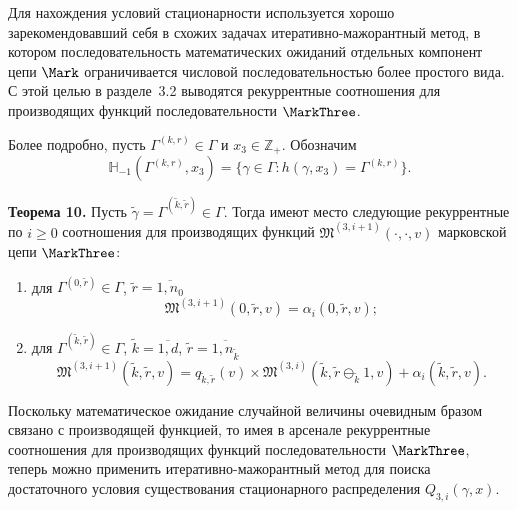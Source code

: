 Для нахождения условий стационарности используется хорошо зарекомендовавший себя в схожих задачах итеративно-мажорантный метод,  в котором последовательность математических ожиданий отдельных компонент цепи $\Mark$ ограничивается числовой последовательностью более простого вида. С этой целью в разделе~3.2 выводятся рекуррентные соотношения для производящих функций последовательности $\MarkThree$.

Более подробно, пусть $\Gamma^{(k, r)}\in \Gamma$ и $x_3 \in {\mathbb Z}_+$. Обозначим 
\begin{equation*}
{\mathbb H}_{-1}(\Gamma^{(k, r)},  x_3) = \{\gamma \in \Gamma \colon h(\gamma,  x_3) = \Gamma^{(k, r)}\}.
\end{equation*}


\textbf{Теорема 10.}
Пусть $\tilde{\gamma}=\Gamma^{(\tilde{k}, \tilde{r})} \in \Gamma$. Тогда имеют место следующие рекуррентные по $i \geqslant 0$ соотношения для производящих функций $\mathfrak{M}^{(3, i+1)}(\cdot, \cdot, v)$ марковской цепи $\MarkThree$:
\begin{enumerate}
\item для $ \Gamma^{(0, \tilde{r})} \in \Gamma$,  $\tilde{r} = \overline{1, n_0}$ 
\begin{equation}
\mathfrak{M}^{(3, i+1)}(0, \tilde{r}, v) = \alpha_i(0, \tilde{r}, v);
\label{three:generation:rek:one}
\end{equation}
\item для $\Gamma^{(\tilde{k}, \tilde{r})} \in \Gamma $,  $\tilde{k} =\overline{1, d}$,  $\tilde{r}=\overline{1, n_{\tilde{k}}}$
\begin{equation}
\mathfrak{M}^{(3, i+1)}(\tilde{k}, \tilde{r}, v) = q_{\tilde{k}, \tilde{r}} (v)\times  \mathfrak{M}^{(3, i)}(\tilde{k}, \tilde{r} \ominus_{\tilde{k}} 1, v) + \alpha_i(\tilde{k}, \tilde{r}, v).
\label{three:generation:rek:two}
\end{equation}
\end{enumerate}

Поскольку математическое ожидание случайной величины очевидным бразом связано с производящей функцией, то имея в арсенале рекуррентные соотношения для производящих функций последовательности $\MarkThree$, теперь можно применить итеративно-мажорантный метод для поиска достаточного условия существования стационарного распределения $Q_{3, i}(\gamma, x)$.


